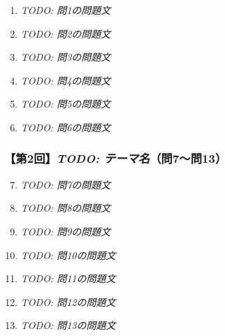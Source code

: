 \documentclass[b4paper,7pt,twocolumn,landscape]{jsarticle}
\begin{document}
\begin{enumerate}
\item \textit{TODO: 問1の問題文}\\

\item \textit{TODO: 問2の問題文}\\

\item \textit{TODO: 問3の問題文}\\

\item \textit{TODO: 問4の問題文}\\

\item \textit{TODO: 問5の問題文}\\

\item \textit{TODO: 問6の問題文}\\
\end{enumerate}

\subsubsection*{【第2回】\textit{TODO: テーマ名}（問7〜問13）}

\begin{enumerate}
\setcounter{enumi}{6}
\item \textit{TODO: 問7の問題文}\\

\item \textit{TODO: 問8の問題文}\\

\item \textit{TODO: 問9の問題文}\\

\item \textit{TODO: 問10の問題文}\\

\item \textit{TODO: 問11の問題文}\\

\item \textit{TODO: 問12の問題文}\\

\item \textit{TODO: 問13の問題文}\\
\end{enumerate}
\end{document}
